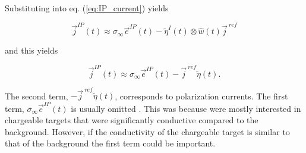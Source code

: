 \documentclass[extra,mreferee]{gji}
\newcommand{\siginf}{\sigma_\infty}
\renewcommand {\j}  { {\vec j} }
\newcommand {\e}  { {\vec e} }
\newcommand{\peta}{\tilde{\eta}}
\newcommand{\jref}{\j^{\ ref}}
\begin{document}
Substituting into eq. (\ref{eq:IP_current}) yields
\begin{linenomath*}
\begin{equation}
  \j^{IP}(t) \approx \siginf\e^{IP}(t) - \peta^{I}(t)\otimes \hat{w}(t)\jref
\end{equation}
\end{linenomath*}
and this yields
\begin{linenomath*}
\begin{equation}
  \j^{IP}(t) \approx \siginf\e^{IP}(t) -\jref\peta(t).
  \label{eq: jip_EMIP}
\end{equation}
\end{linenomath*}

The second term, $-\jref\peta(t)$, corresponds to polarization currents. The first term, $\siginf \e^{IP}(t)$ is usually omitted \cite[]{Smith1988a}. This was because \cite{Smith1988a} were mostly interested in chargeable targets that were significantly conductive compared to the background. However, if the conductivity of the chargeable target is similar to that of the background the first term could be important. 

\end{document}

